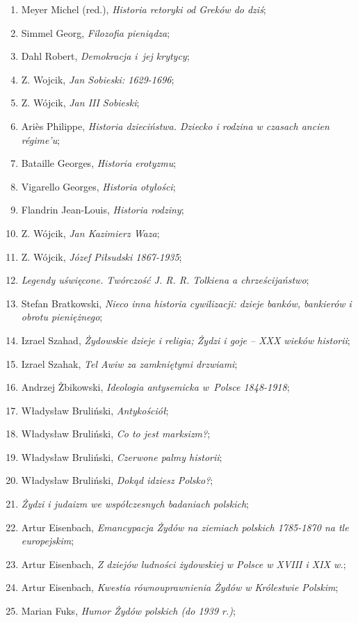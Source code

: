 \documentclass[a4paper,11pt]{article}
\begin{document}
\begin{enumerate}
\item Meyer Michel (red.), \emph{Historia retoryki od Greków do dziś};
\item Simmel Georg, \emph{Filozofia pieniądza};
\item Dahl Robert, \emph{Demokracja i~jej krytycy};
\item Z. Wojcik, \emph{Jan Sobieski: 1629-1696};
\item Z. Wójcik, \emph{Jan III Sobieski};
\item Ariès Philippe, \emph{Historia dzieciństwa. Dziecko i rodzina w
    czasach ancien régime’u};
\item Bataille Georges, \emph{Historia erotyzmu};
\item Vigarello Georges, \emph{Historia otyłości};
\item Flandrin Jean-Louis, \emph{Historia rodziny};
\item Z. Wójcik, \emph{Jan Kazimierz Waza};
\item Z. Wójcik, \emph{Józef Piłsudski 1867-1935};
\item \emph{Legendy uświęcone. Twórczość J. R. R. Tolkiena a
    chrześcijaństwo};
\item Stefan Bratkowski, \emph{Nieco inna historia cywilizacji: dzieje
    banków, bankierów i obrotu pieniężnego};
\item Izrael Szahad, \emph{Żydowskie dzieje i religia; Żydzi i goje –
    XXX wieków historii};
\item Izrael Szahak, \emph{Tel Awiw za zamkniętymi drzwiami};
\item Andrzej Żbikowski, \emph{Ideologia antysemicka w~Polsce
    1848-1918};
\item Władysław Bruliński, \emph{Antykościół};
\item Władysław Bruliński, \emph{Co to jest marksizm?};
\item Władysław Bruliński, \emph{Czerwone palmy historii};
\item Władysław Bruliński, \emph{Dokąd idziesz Polsko?};
\item \emph{Żydzi i judaizm we współczesnych badaniach polskich};
\item Artur Eisenbach, \emph{Emancypacja Żydów na ziemiach polskich
    1785-1870 na tle europejskim};
\item Artur Eisenbach, \emph{Z dziejów ludności żydowskiej w Polsce w
    XVIII i XIX w.};
\item Artur Eisenbach, \emph{Kwestia równouprawnienia Żydów w
    Królestwie Polskim};
\item Marian Fuks, \emph{Humor Żydów polskich (do 1939 r.)};

\end{enumerate}
\end{document}
